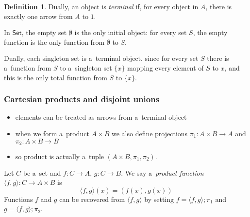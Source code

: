 \documentclass{amsart}
\theoremstyle{definition}
\newtheorem{definition}[thm]{Definition}
\newcommand{\cat}[1]{\mathsf{#1}} %
\renewcommand{\emph}{\textit} %
\begin{document}
\begin{definition}
Dually, an object is \emph{terminal} if, for every object in $A$, there is exactly one arrow from $A$ to $1$. 
\end{definition}

In $\cat{Set}$, the empty set $\emptyset$ is the only initial object: for every set $S$, the empty function is the only function from $\emptyset$ to $S$.

Dually, each singleton set is a~terminal object, since for every set $S$ there is a~function from $S$ to a~singleton set $\{x\}$ mapping every element of $S$ to $x$, and this is the only total function from $S$ to $\{x\}$. 

\subsubsection{Cartesian products and disjoint unions}

\begin{itemize}
\item elements can be treated as arrows from a~terminal object
\item when we form a~product $A\times B$ we also define projections $\pi_{1}: A\times B \to A$ and $\pi_{2}: A\times B \to B$
\item so product is actually a~tuple $(A\times B, \pi_{1},\pi_{2})$.
\end{itemize}

Let $C$ be a~set and $f: C\to A$, $g: C\to B$. We say a~\emph{product function} $\langle f,g\rangle: C \to A\times B$ is
\[
\langle f, g\rangle (x) = (f(x), g(x))
\]
Functions $f$ and $g$ can be recovered from $\langle f, g\rangle$ by setting $f = \langle f,g\rangle;\! \pi_{1}$ and $g = \langle f, g\rangle;\! \pi_{2}$.
\end{document}
